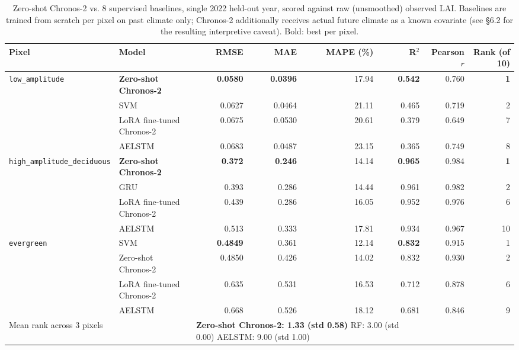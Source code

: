 \begin{table}[t]
\centering
\caption{Zero-shot Chronos-2 vs. 8 supervised baselines, single 2022 held-out year, scored against
raw (unsmoothed) observed LAI. Baselines are trained from scratch per pixel on past climate only;
Chronos-2 additionally receives actual future climate as a known covariate (see \S6.2 for the
resulting interpretive caveat). Bold: best per pixel.}
\label{tab:main_comparison}
\begin{tabular}{llrrrrrr}
\toprule
Pixel & Model & RMSE & MAE & MAPE (\%) & R$^2$ & Pearson $r$ & Rank (of 10) \\
\midrule
\multirow{3}{*}{\texttt{low\_amplitude}}
 & \textbf{Zero-shot Chronos-2} & \textbf{0.0580} & \textbf{0.0396} & 17.94 & \textbf{0.542} & 0.760 & \textbf{1} \\
 & SVM & 0.0627 & 0.0464 & 21.11 & 0.465 & 0.719 & 2 \\
 & LoRA fine-tuned Chronos-2 & 0.0675 & 0.0530 & 20.61 & 0.379 & 0.649 & 7 \\
 & AELSTM & 0.0683 & 0.0487 & 23.15 & 0.365 & 0.749 & 8 \\
\midrule
\multirow{3}{*}{\texttt{high\_amplitude\_deciduous}}
 & \textbf{Zero-shot Chronos-2} & \textbf{0.372} & \textbf{0.246} & 14.14 & \textbf{0.965} & 0.984 & \textbf{1} \\
 & GRU & 0.393 & 0.286 & 14.44 & 0.961 & 0.982 & 2 \\
 & LoRA fine-tuned Chronos-2 & 0.439 & 0.286 & 16.05 & 0.952 & 0.976 & 6 \\
 & AELSTM & 0.513 & 0.333 & 17.81 & 0.934 & 0.967 & 10 \\
\midrule
\multirow{3}{*}{\texttt{evergreen}}
 & SVM & \textbf{0.4849} & 0.361 & 12.14 & \textbf{0.832} & 0.915 & 1 \\
 & Zero-shot Chronos-2 & 0.4850 & 0.426 & 14.02 & 0.832 & 0.930 & 2 \\
 & LoRA fine-tuned Chronos-2 & 0.635 & 0.531 & 16.53 & 0.712 & 0.878 & 6 \\
 & AELSTM & 0.668 & 0.526 & 18.12 & 0.681 & 0.846 & 9 \\
\midrule
\multicolumn{2}{l}{Mean rank across 3 pixels} & \multicolumn{4}{l}{\textbf{Zero-shot Chronos-2: 1.33 (std 0.58)} \quad RF: 3.00 (std 0.00) \quad AELSTM: 9.00 (std 1.00)} \\
\bottomrule
\end{tabular}
\end{table}

